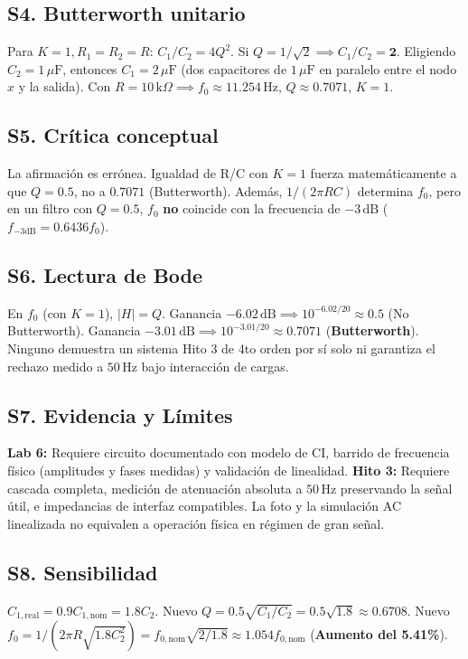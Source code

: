 \documentclass[10pt, a4paper]{article}
\begin{document}
\subsection*{S4. Butterworth unitario}
Para $K=1, R_1=R_2=R$: $C_1/C_2 = 4Q^2$. Si $Q=1/\sqrt{2} \implies C_1/C_2 = \mathbf{2}$.
Eligiendo $C_2 = 1\,\mu\mathrm{F}$, entonces $C_1 = 2\,\mu\mathrm{F}$ (dos capacitores de $1\,\mu\mathrm{F}$ en paralelo entre el nodo $x$ y la salida).
Con $R = 10\,\mathrm{k}\Omega \implies f_0 \approx \mathbf{11.254\,\mathrm{Hz}}$, $Q \approx \mathbf{0.7071}$, $K=1$.

\subsection*{S5. Crítica conceptual}
La afirmación es errónea. Igualdad de R/C con $K=1$ fuerza matemáticamente a que $Q=0.5$, no a $0.7071$ (Butterworth). Además, $1/(2\pi RC)$ determina $f_0$, pero en un filtro con $Q=0.5$, $f_0$ \textbf{no} coincide con la frecuencia de $-3\,\mathrm{dB}$ ($f_{-3\mathrm{dB}} = 0.6436 f_0$).

\subsection*{S6. Lectura de Bode}
En $f_0$ (con $K=1$), $|H|=Q$. Ganancia $-6.02\,\mathrm{dB} \implies 10^{-6.02/20} \approx \mathbf{0.5}$ (No Butterworth). Ganancia $-3.01\,\mathrm{dB} \implies 10^{-3.01/20} \approx \mathbf{0.7071}$ (\textbf{Butterworth}). Ninguno demuestra un sistema Hito 3 de 4to orden por sí solo ni garantiza el rechazo medido a $50\,\mathrm{Hz}$ bajo interacción de cargas.

\subsection*{S7. Evidencia y Límites}
\textbf{Lab 6:} Requiere circuito documentado con modelo de CI, barrido de frecuencia físico (amplitudes y fases medidas) y validación de linealidad. \textbf{Hito 3:} Requiere cascada completa, medición de atenuación absoluta a $50\,\mathrm{Hz}$ preservando la señal útil, e impedancias de interfaz compatibles. La foto y la simulación AC linealizada no equivalen a operación física en régimen de gran señal.

\subsection*{S8. Sensibilidad}
$C_{1,\mathrm{real}} = 0.9 C_{1,\mathrm{nom}} = 1.8 C_2$.
Nuevo $Q = 0.5 \sqrt{C_1/C_2} = 0.5 \sqrt{1.8} \approx \mathbf{0.6708}$.
Nuevo $f_0 = 1 / (2\pi R \sqrt{1.8 C_2^2}) = f_{0,\mathrm{nom}} \sqrt{2/1.8} \approx 1.054 f_{0,\mathrm{nom}}$ (\textbf{Aumento del 5.41\%}).
\end{document}

